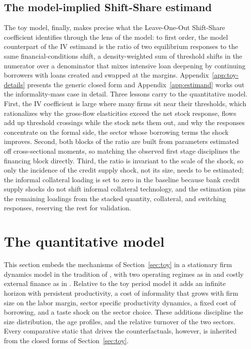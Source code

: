 \documentclass[12pt]{article}
\begin{document}
\subsection{The model-implied Shift-Share estimand}
\label{sec:toy-ssiv}
 
The toy model, finally, makes precise what the Leave-One-Out Shift-Share coefficient identifies through the lens of the model: to first order, the model counterpart of the IV estimand is the ratio of two equilibrium responses to the same financial-conditions shift, a density-weighted sum of threshold shifts in the numerator over a denominator that mixes intensive loan deepening by continuing borrowers with loans created and swapped at the margins. Appendix~\ref{app:toy-details} presents the generic closed form and Appendix~\ref{app:estimand} works out the informality-mass case in detail. Three lessons carry to the quantitative model. First, the IV coefficient is large where many firms sit near their thresholds, which rationalizes why the gross-flow elasticities exceed the net stock response, flows add up threshold crossings while the stock nets them out, and why the responses concentrate on the formal side, the sector whose borrowing terms the shock improves. Second, both blocks of the ratio are built from parameters estimated off cross-sectional moments, so matching the observed first stage disciplines the financing block directly. Third, the ratio is invariant to the scale of the shock, so only the incidence of the credit supply shock, not its size, needs to be estimated; the informal collateral loading is set to zero in the baseline because bank credit supply shocks do not shift informal collateral technology, and the estimation pins the remaining loadings from the stacked quantity, collateral, and switching responses, reserving the rest for validation.

\section{The quantitative model}
\label{sec:model-general}

This section embeds the mechanisms of Section~\ref{sec:toy} in a stationary firm dynamics model in the tradition of \citet{hopenhayn1992entry}, with two operating regimes as in \citet{ulyssea2018firms} and costly external finance as in \citet{gomes2001financing}. Relative to the toy period model it adds an infinite horizon with persistent productivity, a cost of informality that grows with firm size on the labor margin, sector specific productivity dynamics, a fixed cost of borrowing, and a taste shock on the sector choice. These additions discipline the size distribution, the age profiles, and the relative turnover of the two sectors. Every comparative static that drives the counterfactuals, however, is inherited from the closed forms of Section~\ref{sec:toy}.
\end{document}
